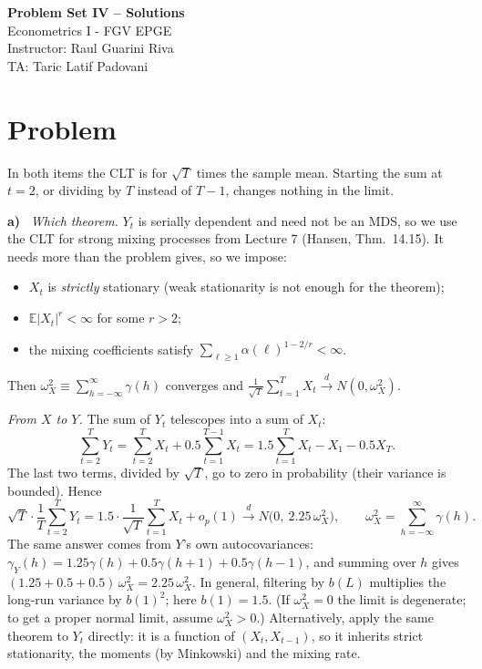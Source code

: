 \documentclass[11pt]{article}
\newcommand{\E}{\mathbb{E}}
\newcounter{problem}
\renewcommand{\theproblem}{\arabic{problem}}
\newcommand{\problem}{
	\stepcounter{problem}
	\section*{Problem \theproblem}
}
\newcommand{\itm}[1]{\par\textbf{#1)}\ }
\begin{document}
	\begin{center}
		{\LARGE{\textbf{Problem Set IV -- Solutions}}}\\
		\vspace{0.2cm}
		Econometrics I - \textcolor{FGVBlue}{FGV EPGE}\\
		Instructor: Raul Guarini Riva \\
		TA: Taric Latif Padovani
	\end{center}

\problem

In both items the CLT is for $\sqrt T$ times the sample mean. Starting the sum at $t=2$, or dividing by $T$ instead of $T-1$, changes nothing in the limit.

\itm{a}
\emph{Which theorem.} $Y_t$ is serially dependent and need not be an MDS, so we use the CLT for strong mixing processes from Lecture 7 (Hansen, Thm.\ 14.15). It needs more than the problem gives, so we impose:
\begin{itemize}
	\item $X_t$ is \emph{strictly} stationary (weak stationarity is not enough for the theorem);
	\item $\E|X_t|^r<\infty$ for some $r>2$;
	\item the mixing coefficients satisfy $\sum_{\ell\ge1}\alpha(\ell)^{1-2/r}<\infty$.
\end{itemize}
Then $\omega_X^2\equiv\sum_{h=-\infty}^\infty\gamma(h)$ converges and $\frac1{\sqrt T}\sum_{t=1}^TX_t\xrightarrow{d}N(0,\omega_X^2)$.

\emph{From $X$ to $Y$.} The sum of $Y_t$ telescopes into a sum of $X_t$:
\[
\sum_{t=2}^TY_t=\sum_{t=2}^TX_t+0.5\sum_{t=1}^{T-1}X_t=1.5\sum_{t=1}^TX_t-X_1-0.5X_T .
\]
The last two terms, divided by $\sqrt T$, go to zero in probability (their variance is bounded). Hence
\[
\sqrt T\cdot\frac1T\sum_{t=2}^TY_t=1.5\cdot\frac1{\sqrt T}\sum_{t=1}^TX_t+o_p(1)\xrightarrow{d}N\big(0,\ 2.25\,\omega_X^2\big),\qquad\omega_X^2=\sum_{h=-\infty}^\infty\gamma(h).
\]
The same answer comes from $Y$'s own autocovariances: $\gamma_Y(h)=1.25\gamma(h)+0.5\gamma(h+1)+0.5\gamma(h-1)$, and summing over $h$ gives $(1.25+0.5+0.5)\,\omega_X^2=2.25\,\omega_X^2$. In general, filtering by $b(L)$ multiplies the long-run variance by $b(1)^2$; here $b(1)=1.5$. (If $\omega_X^2=0$ the limit is degenerate; to get a proper normal limit, assume $\omega_X^2>0$.) Alternatively, apply the same theorem to $Y_t$ directly: it is a function of $(X_t,X_{t-1})$, so it inherits strict stationarity, the moments (by Minkowski) and the mixing rate.
\end{document}
